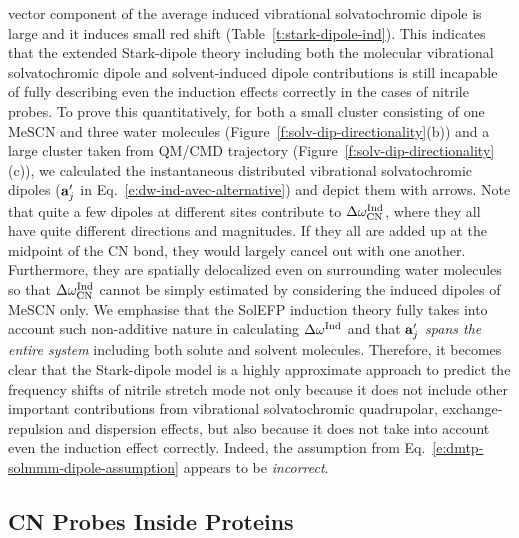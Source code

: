 \documentclass[a4paper,titlepage,twoside,fleqn,12pt]{book}
\begin{document}
\begin{refsection}
vector component of the average induced vibrational
solvatochromic dipole is large and it induces small red shift
(Table~\ref{t:stark-dipole-ind}). This indicates that the extended Stark\hyp{}dipole theory
including both the molecular vibrational solvatochromic dipole
and solvent\hyp{}induced dipole contributions \citep{Fried.Wang.Boxer.Ren.Pande.JPCB.2013} 
is still incapable of
fully describing even the induction effects correctly in the
cases of nitrile probes. To prove this quantitatively, for both a
small cluster consisting of one MeSCN and three water
molecules (Figure~\ref{f:solv-dip-directionality}(b)) and a large cluster taken from QM/CMD
trajectory (Figure~\ref{f:solv-dip-directionality}(c)), we calculated the instantaneous distributed
vibrational solvatochromic dipoles (${\bf a}_j'$ in Eq.~\eqref{e:dw-ind-avec-alternative}) 
and depict
them with arrows. 
%
Note that quite a few dipoles at different
sites contribute to $\Delta\omega_{\rm CN}^{\rm Ind}$, 
where they all have quite different
directions and magnitudes. If they all are added up at the midpoint
of the CN bond, they would largely cancel out with one
another. Furthermore, they are spatially delocalized even on
surrounding water molecules so that $\Delta\omega_{\rm CN}^{\rm Ind}$
cannot be simply
estimated by considering the induced dipoles of MeSCN only.
We emphasise that the SolEFP induction theory fully takes into
account such non\hyp{}additive nature in calculating $\Delta\omega^{\rm Ind}$ 
and that
${\bf a}_j'$ \emph{spans the entire system} including both solute and solvent
molecules. \citep{Blasiak.Cho.JCP.2014} 
Therefore, it becomes clear that the Stark\hyp{}dipole
model is a highly approximate approach to predict the
frequency shifts of nitrile stretch mode not only because it
does not include other important contributions from
vibrational solvatochromic quadrupolar, exchange\hyp{}repulsion
and dispersion effects, but also because it does not take into
account even the induction effect correctly. Indeed, the assumption
from Eq.~\eqref{e:dmtp-solmmm-dipole-assumption} appears to be \emph{incorrect}.

\subsection{CN Probes Inside Proteins}


\end{refsection}
\end{document}
